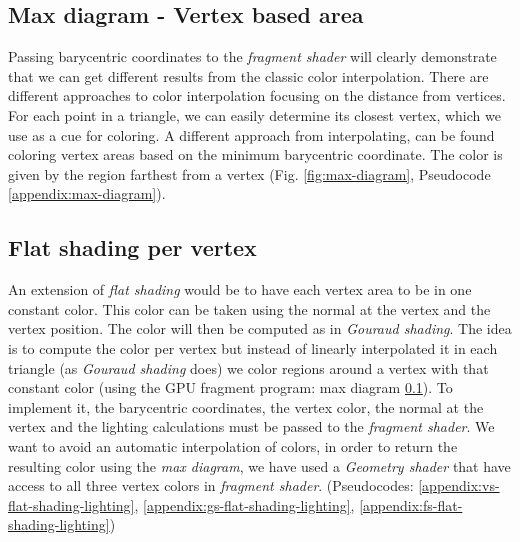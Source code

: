 
\subsection{Max diagram - Vertex based area} \label{section:max-diagram}
Passing barycentric coordinates to the \textit{fragment shader} will clearly demonstrate that we can get different results from the classic color interpolation.\cite{WEBSITE:redbloggames}
There are different approaches to color interpolation focusing on the distance from vertices. For each point in a triangle, we can easily determine its closest vertex, which we use as a cue for coloring.
A different approach from interpolating, can be found coloring vertex areas based on the minimum barycentric coordinate.
The color is given by the region farthest from a vertex (Fig. \ref{fig:max-diagram}, Pseudocode \ref{appendix:max-diagram}).


\subsection{Flat shading per vertex} \label{section:extend-flat-shading-lighting}
An extension of \textit{flat shading} would be to have each vertex area to be in one constant color. This color can be taken using the normal at the vertex and the vertex position.
The color will then be computed as in \textit{Gouraud shading}.
The idea is to compute the color per vertex but instead of linearly interpolated it in each triangle (as \textit{Gouraud shading} does) we color regions around a vertex with that constant color (using the GPU fragment program: max diagram \ref{section:max-diagram}).
To implement it, the barycentric coordinates, the vertex color, the normal at the vertex and the lighting calculations must be passed to the \textit{fragment shader}.
We want to avoid an automatic interpolation of colors, in order to return the resulting color using the \textit{max diagram}, we have used a \textit{Geometry shader} that have access to all three vertex colors in \textit{fragment shader}. (Pseudocodes: \ref{appendix:vs-flat-shading-lighting}, \ref{appendix:gs-flat-shading-lighting}, \ref{appendix:fs-flat-shading-lighting})


